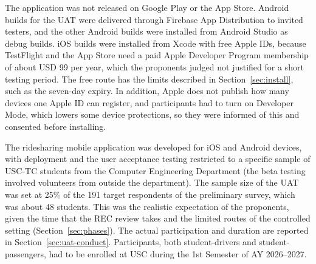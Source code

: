 The application was not released on Google Play or the App Store. Android builds for the UAT were delivered through Firebase App Distribution to invited testers, and the other Android builds were installed from Android Studio as debug builds. iOS builds were installed from Xcode with free Apple IDs, because TestFlight and the App Store need a paid Apple Developer Program membership of about USD 99 per year, which the proponents judged not justified for a short testing period. The free route has the limits described in Section~\ref{sec:install}, such as the seven-day expiry. In addition, Apple does not publish how many devices one Apple ID can register, and participants had to turn on Developer Mode, which lowers some device protections, so they were informed of this and consented before installing.

The ridesharing mobile application was developed for iOS and Android devices, with deployment and the user acceptance testing restricted to a specific sample of USC-TC students from the Computer Engineering Department (the beta testing involved volunteers from outside the department). The sample size of the UAT was set at 25\% of the 191 target respondents of the preliminary survey, which was about 48 students. This was the realistic expectation of the proponents, given the time that the REC review takes and the limited routes of the controlled setting (Section~\ref{sec:phases}). The actual participation and duration are reported in Section~\ref{sec:uat-conduct}. Participants, both student-drivers and student-passengers, had to be enrolled at USC during the 1st Semester of AY 2026--2027.


